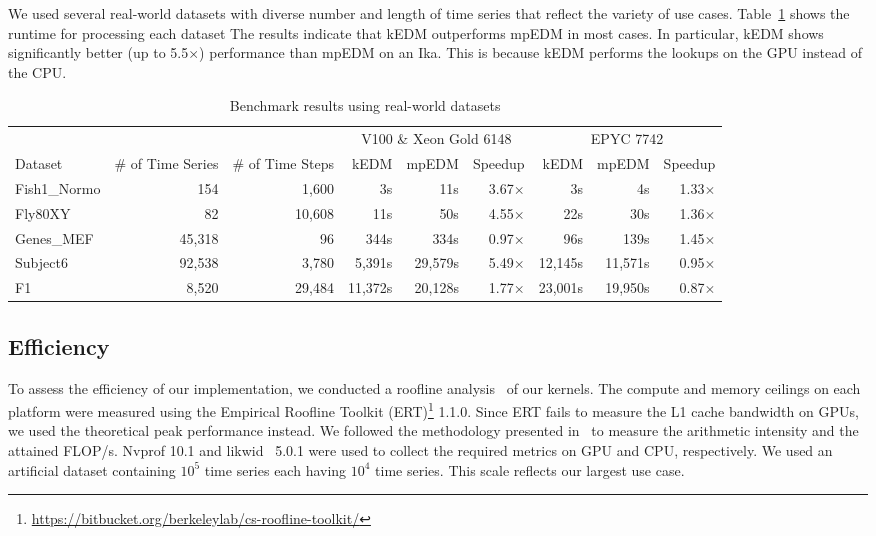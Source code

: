\documentclass[sigconf]{acmart}
\begin{document}
We used several real-world datasets with diverse number and length of time
series that reflect the variety of use cases.
Table~\ref{tbl:real-world} shows the runtime for processing each dataset The
results indicate that kEDM outperforms mpEDM in most cases. In particular,
kEDM shows significantly better (up to 5.5$\times$) performance than mpEDM on
an Ika\@. This is because kEDM performs the lookups on the GPU instead of the
CPU\@.

\begin{table}
\centering
\caption{Benchmark results using real-world datasets}%
\label{tbl:real-world}
\begin{tabular}{@{}lrrrrrrrr@{}}
\toprule
             & \multicolumn{1}{c}{} & \multicolumn{1}{c}{} & \multicolumn{3}{c}{V100 \& Xeon Gold 6148 } & \multicolumn{3}{c}{EPYC 7742} \\ \cmidrule(l){4-6}  \cmidrule(l){7-9}
Dataset      & \multicolumn{1}{c}{\# of Time Series} & \multicolumn{1}{c}{\# of Time Steps} & kEDM & mpEDM & Speedup & kEDM & mpEDM & Speedup \\ \midrule
Fish1\_Normo & 154    & 1,600  &      3s &     11s & 3.67$\times$ &      3s &      4s & 1.33$\times$ \\
Fly80XY      & 82     & 10,608 &     11s &     50s & 4.55$\times$ &     22s &     30s & 1.36$\times$ \\
Genes\_MEF   & 45,318 & 96     &    344s &    334s & 0.97$\times$ &     96s &    139s & 1.45$\times$ \\
Subject6     & 92,538 & 3,780  &  5,391s & 29,579s & 5.49$\times$ & 12,145s & 11,571s & 0.95$\times$ \\
F1           & 8,520  & 29,484 & 11,372s & 20,128s & 1.77$\times$ & 23,001s & 19,950s & 0.87$\times$ \\ \bottomrule
\end{tabular}
\end{table}

\subsection{Efficiency}

To assess the efficiency of our implementation, we conducted a roofline
analysis~\cite{Williams2008} of our kernels. The compute and memory ceilings
on each platform were measured using the Empirical Roofline Toolkit (ERT)\footnote{\url{https://bitbucket.org/berkeleylab/cs-roofline-toolkit/}} 1.1.0.
Since ERT fails to measure the L1 cache bandwidth on GPUs, we used the
theoretical peak performance instead. We followed the methodology presented
in~\cite{Yang2020a,Yang2020b} to measure the arithmetic intensity and the
attained FLOP/s. Nvprof 10.1 and likwid~\cite{Treibig2010} 5.0.1 were used to
collect the required metrics on GPU and CPU, respectively.
We used an artificial dataset containing $10^5$ time series each having $10^4$
time series. This scale reflects our largest use case.
\end{document}
